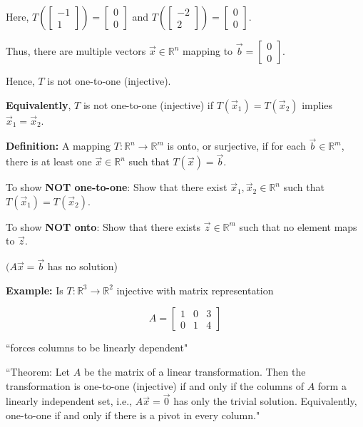 \documentclass{article}
\begin{document}
Here, $T(\begin{bmatrix} -1 \\ 1 \end{bmatrix}) = \begin{bmatrix} 0 \\ 0 \end{bmatrix}$ and $T(\begin{bmatrix} -2 \\ 2 \end{bmatrix}) = \begin{bmatrix} 0 \\ 0 \end{bmatrix}$. 

Thus, there are multiple vectors $\vec{x} \in \mathbb{R}^n$ mapping to $\vec{b} = \begin{bmatrix} 0 \\ 0 \end{bmatrix}$. 

Hence, $T$ is not one-to-one (injective).

\textbf{Equivalently}, $T$ is not one-to-one (injective) if $T(\vec{x}_1) = T(\vec{x}_2)$ implies $\vec{x}_1 = \vec{x}_2$.


\textbf{Definition:} A mapping $T: \mathbb{R}^n \rightarrow \mathbb{R}^m$ is onto, or surjective, if for each $\vec{b} \in \mathbb{R}^m$, there is at least one $\vec{x} \in \mathbb{R}^n$ such that $T(\vec{x}) = \vec{b}$.




To show \textbf{NOT one-to-one}: Show that there exist $\vec{x}_1, \vec{x}_2 \in \mathbb{R}^n$ such that $T(\vec{x}_1) = T(\vec{x}_2)$.

To show \textbf{NOT onto}: Show that there exists $\vec{z} \in \mathbb{R}^m$ such that no element maps to $\vec{z}$.

$(A\vec{x} = \vec{b}$ has no solution)

\textbf{Example:} Is $T : \mathbb{R}^3 \rightarrow \mathbb{R}^2$ injective with matrix representation

\[ A = \begin{bmatrix} 1 & 0 & 3 \\ 0 & 1 & 4 \end{bmatrix} \]

``forces columns to be linearly dependent"

``Theorem: Let $A$ be the matrix of a linear transformation. Then the transformation is one-to-one (injective) if and only if the columns of $A$ form a linearly independent set, i.e., $A\vec{x} = \vec{0}$ has only the trivial solution. Equivalently, one-to-one if and only if there is a pivot in every column."
\end{document}
